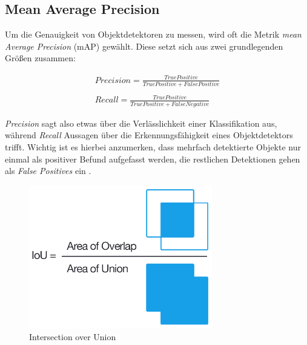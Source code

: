 \subsection*{Mean Average Precision}

Um die Genauigkeit von Objektdetektoren zu messen, wird oft die Metrik \textit{mean Average Precision} (mAP) gewählt. Diese setzt sich aus zwei grundlegenden Größen zusammen:

\begin{equation} \label{precisionandrecall}
\begin{split}
Precision = \frac{True Positive}{True Positive + False Positive} \\
\\
Recall = \frac{True Positive}{True Positive + False Negative}
\end{split}
\end{equation}

\textit{Precision} sagt also etwas über die Verlässlichkeit einer Klassifikation aus, während \textit{Recall} Aussagen über die Erkennungsfähigkeit eines Objektdetektors trifft. Wichtig ist es hierbei anzumerken, dass mehrfach detektierte Objekte nur einmal als positiver Befund aufgefasst werden, die restlichen Detektionen gehen als \textit{False Positives} ein \cite{PaulHenderson.2017}.

\begin{figure}[H]
	\begin{center}
		\includegraphics[width=8cm]{Bilder/iou_equation.png} 
		\caption[Intersection over Union]{Intersection over Union \cite{AdrianRosebrock.20161107}}
		\label{iou}
	\end{center}
\end{figure}

